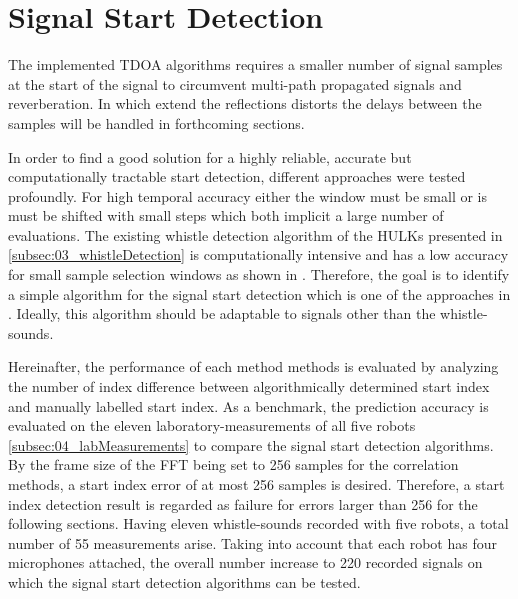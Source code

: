 \section{Signal Start Detection}
\label{sec:04_signalStartDetection}

The implemented \ac{TDOA} algorithms requires a smaller number of signal samples
at the start of the signal to circumvent multi-path propagated signals and reverberation.
In which extend the reflections distorts the delays between the samples
will be handled in forthcoming sections.


In order to find a good solution for a highly reliable, accurate but
computationally tractable start detection, different approaches were
tested profoundly.
For high temporal accuracy either the window must be small or is must
be shifted with small steps which both implicit a large number of evaluations.
The existing whistle detection algorithm of the HULKs presented in
\cref{subsec:03_whistleDetection} is computationally intensive and has a low
accuracy for small sample selection windows as shown in \label{subsec:04_whistleDetection}.
Therefore, the goal is to identify a simple algorithm for
the signal start detection which is one of the approaches in .
Ideally, this algorithm should be adaptable to signals other than the whistle-sounds.

Hereinafter, the performance of each method methods is evaluated by
analyzing the number of index difference between algorithmically determined start index
and manually labelled start index.
As a benchmark, the prediction accuracy is evaluated on the eleven laboratory-measurements
of all five robots \cref{subsec:04_labMeasurements} to compare the signal start detection algorithms.
By the frame size of the \ac{FFT} being set to 256 samples for the
correlation methods, a start index error of at most 256 samples is
desired.
Therefore, a start index detection result is regarded as failure for errors
larger than 256 for the following sections.
Having eleven whistle-sounds recorded with five robots, a total number
of 55 measurements arise.
Taking into account that each robot has four microphones attached,
the overall number increase to 220 recorded signals on which the signal start detection
algorithms can be tested.


